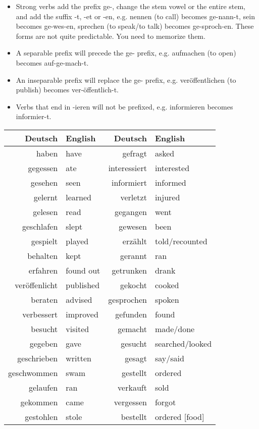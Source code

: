 \begin{itemize}
  \item  Strong verbs add the prefix ge-, change the stem vowel or the entire stem, and add the suffix -t, -et or -en, e.g. nennen (to call) becomes ge-nann-t, sein becomes ge-wes-en, sprechen (to speak/to talk) becomes ge-sproch-en. These forms are not quite predictable. You need to memorize them.
	\item  A separable prefix will precede the ge- prefix, e.g. aufmachen (to open) becomes auf-ge-mach-t.
	\item  An inseparable prefix will replace the ge- prefix, e.g. veröffentlichen (to publish) becomes ver-öffentlich-t.
	\item  Verbs that end in -ieren will not be prefixed, e.g. informieren becomes informier-t.
\end{itemize}

\pagebreak
\begin{center}\begin{tabular}{r|l||r|l}
  \textbf{Deutsch} & \textbf{English} & \textbf{Deutsch} & \textbf{English} \\
	\hline
	haben & have & gefragt & asked \\
	gegessen & ate & interessiert & interested \\
	gesehen & seen & informiert & informed \\
	gelernt & learned & verletzt & injured \\
	gelesen & read & gegangen & went \\
	geschlafen & slept & gewesen & been \\
	gespielt & played & erz{\"a}hlt & told/recounted \\
	behalten & kept & gerannt & ran \\
	erfahren & found out & getrunken & drank \\
	ver{\"o}ffenlicht & published & gekocht & cooked \\
	beraten & advised & gesprochen & spoken \\
	verbessert & improved & gefunden & found \\
	besucht & visited & gemacht & made/done \\
	gegeben & gave & gesucht & searched/looked \\
	geschrieben & written & gesagt & say/said \\
	geschwommen & swam & gestellt & ordered \\
	gelaufen & ran & verkauft & sold \\
	gekommen & came & vergessen & forgot \\
	gestohlen & stole & bestellt & ordered [food] \\
\end{tabular}\end{center}

